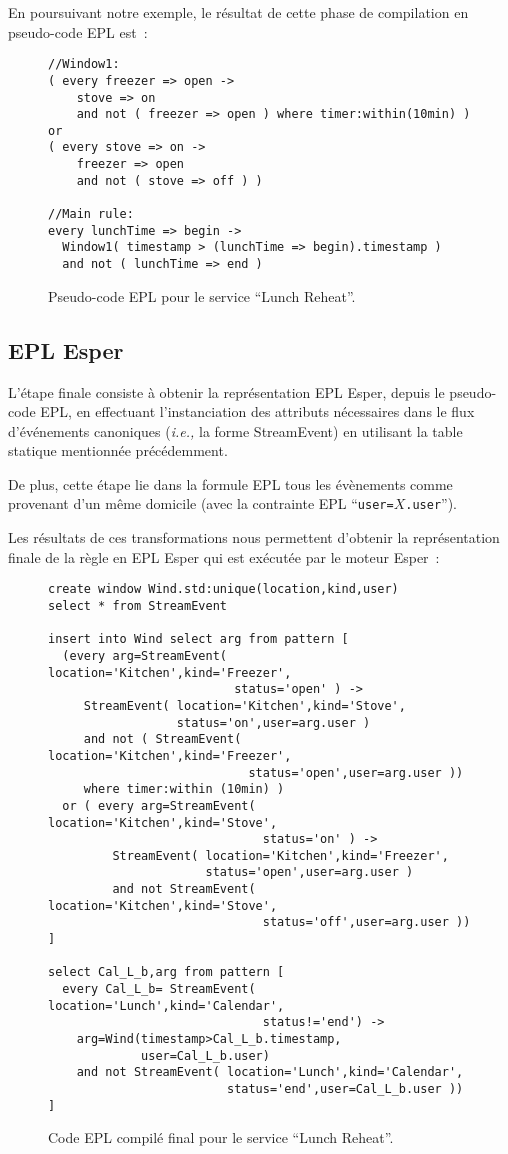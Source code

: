 En poursuivant notre exemple, le résultat de 
cette phase de compilation en pseudo-code EPL est~:
\begin{figure}[!h]
\begin{lstlisting}[language=EPLPseudoCode]
//Window1:
( every freezer => open -> 
    stove => on 
    and not ( freezer => open ) where timer:within(10min) ) 
or  
( every stove => on -> 
    freezer => open 
    and not ( stove => off ) ) 

//Main rule:
every lunchTime => begin ->
  Window1( timestamp > (lunchTime => begin).timestamp )
  and not ( lunchTime => end )
\end{lstlisting}
\caption{Pseudo-code EPL pour le service ``Lunch Reheat''.}
\label{listing:pseudo_reheat}
\end{figure}

\subsection{EPL Esper}
L'étape finale consiste à obtenir la représentation EPL Esper, depuis le pseudo-code EPL, 
en effectuant l'instanciation des attributs nécessaires dans le flux d'événements 
canoniques ({\em i.e.,} la forme StreamEvent) en utilisant la table
statique mentionnée précédemment.

De plus, cette étape lie dans la formule EPL tous les évènements comme provenant d'un même domicile 
(avec la contrainte EPL ``{\tt user=$X$.user}''). 

Les résultats de ces transformations nous permettent d'obtenir la représentation finale de la 
règle en EPL Esper qui est exécutée par le moteur Esper~:
\clearpage
\begin{figure}[h!]
\begin{lstlisting}[language=EPL]
create window Wind.std:unique(location,kind,user) 
select * from StreamEvent

insert into Wind select arg from pattern [ 
  (every arg=StreamEvent( location='Kitchen',kind='Freezer',
                          status='open' ) ->
     StreamEvent( location='Kitchen',kind='Stove',
                  status='on',user=arg.user ) 
     and not ( StreamEvent( location='Kitchen',kind='Freezer',
                            status='open',user=arg.user )) 
     where timer:within (10min) )
  or ( every arg=StreamEvent( location='Kitchen',kind='Stove',
                              status='on' ) -> 
         StreamEvent( location='Kitchen',kind='Freezer',
                      status='open',user=arg.user ) 
         and not StreamEvent( location='Kitchen',kind='Stove',
                              status='off',user=arg.user )) 
]

select Cal_L_b,arg from pattern [ 
  every Cal_L_b= StreamEvent( location='Lunch',kind='Calendar',
                              status!='end') ->
    arg=Wind(timestamp>Cal_L_b.timestamp,
             user=Cal_L_b.user) 
    and not StreamEvent( location='Lunch',kind='Calendar',
                         status='end',user=Cal_L_b.user )) 
]
\end{lstlisting}
\caption{Code EPL compilé final pour le service ``Lunch Reheat''.} 
\label{listing:epl_reheat}
\end{figure}

